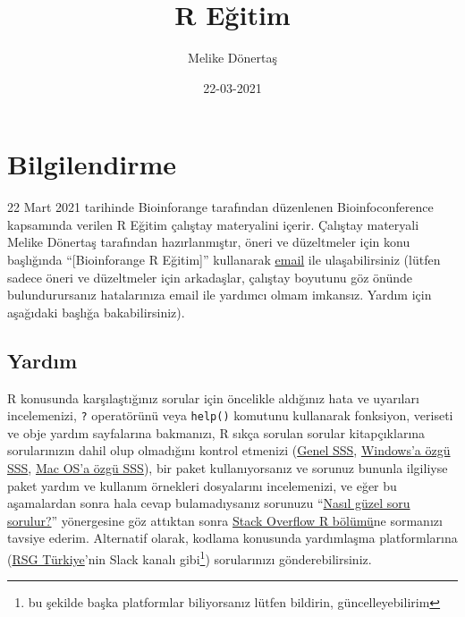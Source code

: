 \documentclass[
]{book}
\title{R Eğitim}
\author{Melike Dönertaş}
\date{22-03-2021}
\begin{document}
\maketitle

{
\setcounter{tocdepth}{1}
\tableofcontents
}
\hypertarget{bilgilendirme}{%
\chapter*{Bilgilendirme}\label{bilgilendirme}}

22 Mart 2021 tarihinde Bioinforange tarafından düzenlenen Bioinfoconference kapsamında verilen R Eğitim çalıştay materyalini içerir. Çalıştay materyali Melike Dönertaş tarafından hazırlanmıştır, öneri ve düzeltmeler için konu başlığında ``{[}Bioinforange R Eğitim{]}'' kullanarak \href{mailto:donertas.melike@gmail.com}{email} ile ulaşabilirsiniz (lütfen sadece öneri ve düzeltmeler için arkadaşlar, çalıştay boyutunu göz önünde bulundurursanız hatalarınıza email ile yardımcı olmam imkansız. Yardım için aşağıdaki başlığa bakabilirsiniz).

\hypertarget{yardux131m}{%
\section*{Yardım}\label{yardux131m}}

R konusunda karşılaştığınız sorular için öncelikle aldığınız hata ve uyarıları incelemenizi, \texttt{?} operatörünü veya \texttt{help()} komutunu kullanarak fonksiyon, veriseti ve obje yardım sayfalarına bakmanızı, R sıkça sorulan sorular kitapçıklarına sorularınızın dahil olup olmadığını kontrol etmenizi (\href{https://cran.r-project.org/doc/FAQ/R-FAQ.html}{Genel SSS}, \href{https://cran.r-project.org/bin/windows/base/rw-FAQ.html}{Windows'a özgü SSS}, \href{https://cran.r-project.org/bin/macosx/RMacOSX-FAQ.html}{Mac OS'a özgü SSS}), bir paket kullanıyorsanız ve sorunuz bununla ilgiliyse paket yardım ve kullanım örnekleri dosyalarını incelemenizi, ve eğer bu aşamalardan sonra hala cevap bulamadıysanız sorunuzu ``\href{https://stackoverflow.com/help/how-to-ask}{Nasıl güzel soru sorulur?}'' yönergesine göz attıktan sonra \href{https://stackoverflow.com/questions/tagged/r}{Stack Overflow R bölümü}ne sormanızı tavsiye ederim. Alternatif olarak, kodlama konusunda yardımlaşma platformlarına (\href{https://rsgturkey.com/}{RSG Türkiye}'nin Slack kanalı gibi\footnote{bu şekilde başka platformlar biliyorsanız lütfen bildirin, güncelleyebilirim}) sorularınızı gönderebilirsiniz.
\end{document}
